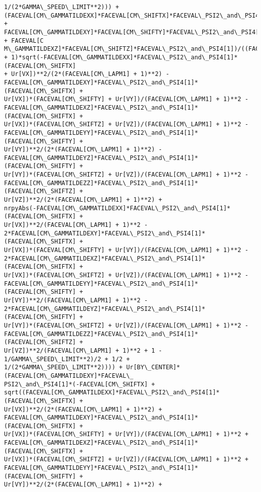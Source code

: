 \documentclass[landscape,letterpaper,10pt,english]{article}
\begin{document}
\begin{Verbatim}[commandchars=\\\{\}]
1/(2*GAMMA\_SPEED\_LIMIT**2))) +
(FACEVAL[CM\_GAMMATILDEXX]*FACEVAL[CM\_SHIFTX]*FACEVAL\_PSI2\_and\_PSI4[1] +
FACEVAL[CM\_GAMMATILDEXY]*FACEVAL[CM\_SHIFTY]*FACEVAL\_PSI2\_and\_PSI4[1] + FACEVAL[C
M\_GAMMATILDEXZ]*FACEVAL[CM\_SHIFTZ]*FACEVAL\_PSI2\_and\_PSI4[1])/((FACEVAL[CM\_LAPM1]
+ 1)*sqrt(-FACEVAL[CM\_GAMMATILDEXX]*FACEVAL\_PSI2\_and\_PSI4[1]*(FACEVAL[CM\_SHIFTX]
+ Ur[VX])**2/(2*(FACEVAL[CM\_LAPM1] + 1)**2) -
FACEVAL[CM\_GAMMATILDEXY]*FACEVAL\_PSI2\_and\_PSI4[1]*(FACEVAL[CM\_SHIFTX] +
Ur[VX])*(FACEVAL[CM\_SHIFTY] + Ur[VY])/(FACEVAL[CM\_LAPM1] + 1)**2 -
FACEVAL[CM\_GAMMATILDEXZ]*FACEVAL\_PSI2\_and\_PSI4[1]*(FACEVAL[CM\_SHIFTX] +
Ur[VX])*(FACEVAL[CM\_SHIFTZ] + Ur[VZ])/(FACEVAL[CM\_LAPM1] + 1)**2 -
FACEVAL[CM\_GAMMATILDEYY]*FACEVAL\_PSI2\_and\_PSI4[1]*(FACEVAL[CM\_SHIFTY] +
Ur[VY])**2/(2*(FACEVAL[CM\_LAPM1] + 1)**2) -
FACEVAL[CM\_GAMMATILDEYZ]*FACEVAL\_PSI2\_and\_PSI4[1]*(FACEVAL[CM\_SHIFTY] +
Ur[VY])*(FACEVAL[CM\_SHIFTZ] + Ur[VZ])/(FACEVAL[CM\_LAPM1] + 1)**2 -
FACEVAL[CM\_GAMMATILDEZZ]*FACEVAL\_PSI2\_and\_PSI4[1]*(FACEVAL[CM\_SHIFTZ] +
Ur[VZ])**2/(2*(FACEVAL[CM\_LAPM1] + 1)**2) +
nrpyAbs(-FACEVAL[CM\_GAMMATILDEXX]*FACEVAL\_PSI2\_and\_PSI4[1]*(FACEVAL[CM\_SHIFTX] +
Ur[VX])**2/(FACEVAL[CM\_LAPM1] + 1)**2 -
2*FACEVAL[CM\_GAMMATILDEXY]*FACEVAL\_PSI2\_and\_PSI4[1]*(FACEVAL[CM\_SHIFTX] +
Ur[VX])*(FACEVAL[CM\_SHIFTY] + Ur[VY])/(FACEVAL[CM\_LAPM1] + 1)**2 -
2*FACEVAL[CM\_GAMMATILDEXZ]*FACEVAL\_PSI2\_and\_PSI4[1]*(FACEVAL[CM\_SHIFTX] +
Ur[VX])*(FACEVAL[CM\_SHIFTZ] + Ur[VZ])/(FACEVAL[CM\_LAPM1] + 1)**2 -
FACEVAL[CM\_GAMMATILDEYY]*FACEVAL\_PSI2\_and\_PSI4[1]*(FACEVAL[CM\_SHIFTY] +
Ur[VY])**2/(FACEVAL[CM\_LAPM1] + 1)**2 -
2*FACEVAL[CM\_GAMMATILDEYZ]*FACEVAL\_PSI2\_and\_PSI4[1]*(FACEVAL[CM\_SHIFTY] +
Ur[VY])*(FACEVAL[CM\_SHIFTZ] + Ur[VZ])/(FACEVAL[CM\_LAPM1] + 1)**2 -
FACEVAL[CM\_GAMMATILDEZZ]*FACEVAL\_PSI2\_and\_PSI4[1]*(FACEVAL[CM\_SHIFTZ] +
Ur[VZ])**2/(FACEVAL[CM\_LAPM1] + 1)**2 + 1 - 1/GAMMA\_SPEED\_LIMIT**2)/2 + 1/2 +
1/(2*GAMMA\_SPEED\_LIMIT**2)))) + Ur[BY\_CENTER]*(FACEVAL[CM\_GAMMATILDEXY]*FACEVAL\_
PSI2\_and\_PSI4[1]*(-FACEVAL[CM\_SHIFTX] +
sqrt((FACEVAL[CM\_GAMMATILDEXX]*FACEVAL\_PSI2\_and\_PSI4[1]*(FACEVAL[CM\_SHIFTX] +
Ur[VX])**2/(2*(FACEVAL[CM\_LAPM1] + 1)**2) +
FACEVAL[CM\_GAMMATILDEXY]*FACEVAL\_PSI2\_and\_PSI4[1]*(FACEVAL[CM\_SHIFTX] +
Ur[VX])*(FACEVAL[CM\_SHIFTY] + Ur[VY])/(FACEVAL[CM\_LAPM1] + 1)**2 +
FACEVAL[CM\_GAMMATILDEXZ]*FACEVAL\_PSI2\_and\_PSI4[1]*(FACEVAL[CM\_SHIFTX] +
Ur[VX])*(FACEVAL[CM\_SHIFTZ] + Ur[VZ])/(FACEVAL[CM\_LAPM1] + 1)**2 +
FACEVAL[CM\_GAMMATILDEYY]*FACEVAL\_PSI2\_and\_PSI4[1]*(FACEVAL[CM\_SHIFTY] +
Ur[VY])**2/(2*(FACEVAL[CM\_LAPM1] + 1)**2) +

\end{Verbatim}
\end{document}
